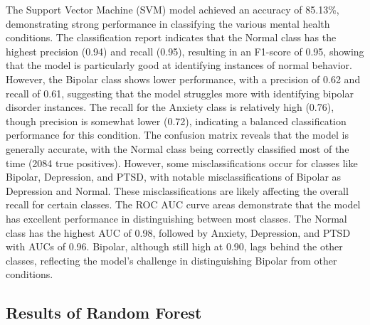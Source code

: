 \noindent
The Support Vector Machine (SVM) model achieved an accuracy of 85.13\%, demonstrating strong performance in classifying the various mental health conditions. The classification report indicates that the Normal class has the highest precision (0.94) and recall (0.95), resulting in an F1-score of 0.95, showing that the model is particularly good at identifying instances of normal behavior. However, the Bipolar class shows lower performance, with a precision of 0.62 and recall of 0.61, suggesting that the model struggles more with identifying bipolar disorder instances. The recall for the Anxiety class is relatively high (0.76), though precision is somewhat lower (0.72), indicating a balanced classification performance for this condition. The confusion matrix reveals that the model is generally accurate, with the Normal class being correctly classified most of the time (2084 true positives). However, some misclassifications occur for classes like Bipolar, Depression, and PTSD, with notable misclassifications of Bipolar as Depression and Normal. These misclassifications are likely affecting the overall recall for certain classes. The ROC AUC curve areas demonstrate that the model has excellent performance in distinguishing between most classes. The Normal class has the highest AUC of 0.98, followed by Anxiety, Depression, and PTSD with AUCs of 0.96. Bipolar, although still high at 0.90, lags behind the other classes, reflecting the model's challenge in distinguishing Bipolar from other conditions.


\subsection{Results of Random Forest}


